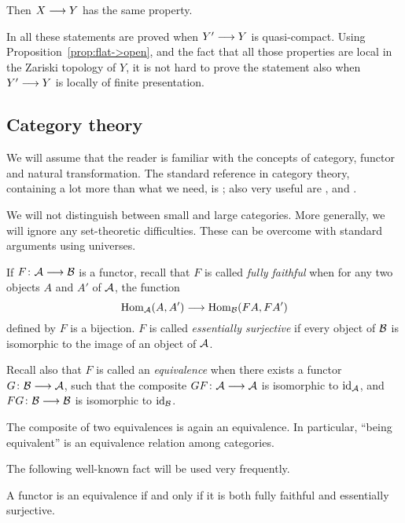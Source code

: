 \begin{1   PRELIMINARY NOTIONS}
\begin{1.1 Algebraic geometry}
\begin{proposition}
Then $X \arr Y$ has the same property.
\end{proposition}

In \cite{ega4-2} all these statements are proved when $Y' \arr Y$ is quasi-compact. Using Proposition~\ref{prop:flat->open}, and the fact that all those properties are local in the Zariski topology of $Y$, it is not hard to prove the statement also when $Y' \arr Y$ is locally of finite presentation.


\end{1.1 Algebraic geometry}
\begin{1.2 Category theory}
\setcounter{section}{1}
\section{Category theory}
\setcounter{theorem}{15}

We will assume that the reader is familiar with the concepts of category, functor and natural transformation. The standard reference in category theory, containing a lot more than what we need, is \cite{maclane98}; also very useful are \cite{borceux1}, \cite{borceux2} and \cite{borceux3}.

We will not distinguish between small and large categories. More generally, we will ignore any set-theoretic difficulties. These can be overcome with standard arguments using universes.

If $F \colon \cA \arr \cB$ is a functor, recall that $F$ is called \emph{fully faithful}%
%
 when for any two objects $A$ and $A'$ of $\mathcal{A}$, the function
   \[
   \hom_{\cA}(A, A') \arr \hom_{\cB}(FA, FA')
   \]
defined by $F$ is a bijection. $F$ is called \emph{essentially surjective}%
%
 if every object of $\mathcal{B}$ is isomorphic to the image of an object of $\mathcal{A}$.

Recall also that $F$ is called an \emph{equivalence}%
 when there exists a functor $G \colon \cB \arr \cA$, such that the composite $GF \colon \cA \arr \cA$ is isomorphic to $\mathrm{id}_{\mathcal{A}}$, and $FG \colon \cB \arr \cB$ is isomorphic to $\mathrm{id}_{\mathcal{B}}$.

The composite of two equivalences is again an equivalence. In particular, ``being equivalent'' is an equivalence relation among categories.

The following well-known fact will be used very frequently.

\begin{proposition}
A functor is an equivalence if and only if it is both fully faithful and essentially surjective.
\end{proposition}


\end{1.2 Category theory}
\end{1   PRELIMINARY NOTIONS}
